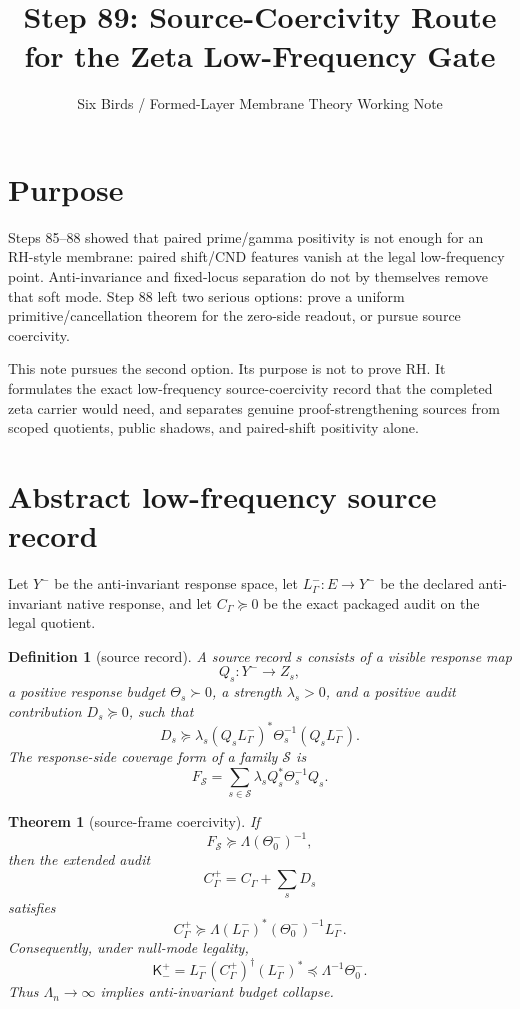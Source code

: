 \documentclass[11pt]{article}
\title{Step 89: Source-Coercivity Route for the Zeta Low-Frequency Gate}
\author{Six Birds / Formed-Layer Membrane Theory Working Note}
\date{}
\newtheorem{theorem}{Theorem}
\newtheorem{definition}{Definition}
\newcommand{\K}{\mathsf K}
\begin{document}
\maketitle

\section{Purpose}
Steps 85--88 showed that paired prime/gamma positivity is not enough for an RH-style membrane: paired shift/CND features vanish at the legal low-frequency point.  Anti-invariance and fixed-locus separation do not by themselves remove that soft mode.  Step 88 left two serious options: prove a uniform primitive/cancellation theorem for the zero-side readout, or pursue source coercivity.

This note pursues the second option.  Its purpose is not to prove RH.  It formulates the exact low-frequency source-coercivity record that the completed zeta carrier would need, and separates genuine proof-strengthening sources from scoped quotients, public shadows, and paired-shift positivity alone.

\section{Abstract low-frequency source record}
Let \(Y^-\) be the anti-invariant response space, let \(L^-_\Gamma:E\to Y^-\) be the declared anti-invariant native response, and let \(C_\Gamma\succeq0\) be the exact packaged audit on the legal quotient.

\begin{definition}[source record]
A source record \(s\) consists of a visible response map
\[
Q_s:Y^-\to Z_s,
\]
a positive response budget \(\Theta_s\succ0\), a strength \(\lambda_s>0\), and a positive audit contribution \(D_s\succeq0\), such that
\[
D_s\succeq \lambda_s (Q_sL^-_\Gamma)^*\Theta_s^{-1}(Q_sL^-_\Gamma).
\]
The response-side coverage form of a family \(\mathcal S\) is
\[
F_{\mathcal S}=\sum_{s\in\mathcal S}\lambda_s Q_s^*\Theta_s^{-1}Q_s.
\]
\end{definition}

\begin{theorem}[source-frame coercivity]
If
\[
F_{\mathcal S}\succeq \Lambda(\Theta_0^-)^{-1},
\]
then the extended audit
\[
C_\Gamma^+=C_\Gamma+\sum_sD_s
\]
satisfies
\[
C_\Gamma^+\succeq \Lambda (L^-_\Gamma)^*(\Theta_0^-)^{-1}L^-_\Gamma.
\]
Consequently, under null-mode legality,
\[
\K_-^+=L^-_\Gamma(C_\Gamma^+)^\dagger(L^-_\Gamma)^*\preceq \Lambda^{-1}\Theta_0^-.
\]
Thus \(\Lambda_n\to\infty\) implies anti-invariant budget collapse.
\end{theorem}
\end{document}
